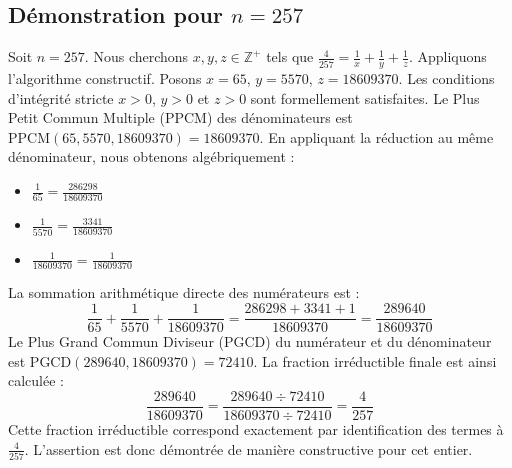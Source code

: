 \documentclass[11pt,a4paper]{article}
\begin{document}
\subsection{Démonstration pour $n = 257$}
Soit $n = 257$. Nous cherchons $x, y, z \in \mathbb{Z}^{+}$ tels que $\frac{4}{257} = \frac{1}{x} + \frac{1}{y} + \frac{1}{z}$.
Appliquons l'algorithme constructif. Posons $x = 65$, $y = 5570$, $z = 18609370$.
Les conditions d'intégrité stricte $x > 0$, $y > 0$ et $z > 0$ sont formellement satisfaites.
Le Plus Petit Commun Multiple (PPCM) des dénominateurs est $\text{PPCM}(65, 5570, 18609370) = 18609370$.
En appliquant la réduction au même dénominateur, nous obtenons algébriquement :
\begin{itemize}
    \item $\frac{1}{65} = \frac{286298}{18609370}$
    \item $\frac{1}{5570} = \frac{3341}{18609370}$
    \item $\frac{1}{18609370} = \frac{1}{18609370}$
\end{itemize}
La sommation arithmétique directe des numérateurs est :
$$ \frac{1}{65} + \frac{1}{5570} + \frac{1}{18609370} = \frac{286298 + 3341 + 1}{18609370} = \frac{289640}{18609370} $$
Le Plus Grand Commun Diviseur (PGCD) du numérateur et du dénominateur est $\text{PGCD}(289640, 18609370) = 72410$.
La fraction irréductible finale est ainsi calculée :
$$ \frac{289640}{18609370} = \frac{289640 \div 72410}{18609370 \div 72410} = \frac{4}{257} $$
Cette fraction irréductible correspond exactement par identification des termes à $\frac{4}{257}$. L'assertion est donc démontrée de manière constructive pour cet entier.
\end{document}
